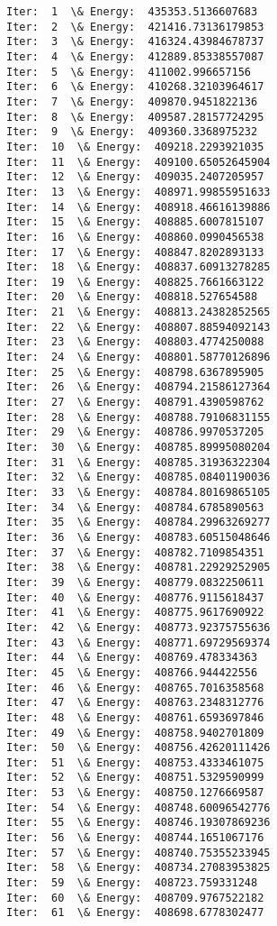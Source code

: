\documentclass[11pt]{article}
\begin{document}
    \begin{Verbatim}[commandchars=\\\{\}]
Iter:  1  \& Energy:  435353.5136607683
Iter:  2  \& Energy:  421416.73136179853
Iter:  3  \& Energy:  416324.43984678737
Iter:  4  \& Energy:  412889.85338557087
Iter:  5  \& Energy:  411002.996657156
Iter:  6  \& Energy:  410268.32103964617
Iter:  7  \& Energy:  409870.9451822136
Iter:  8  \& Energy:  409587.28157724295
Iter:  9  \& Energy:  409360.3368975232
Iter:  10  \& Energy:  409218.2293921035
Iter:  11  \& Energy:  409100.65052645904
Iter:  12  \& Energy:  409035.2407205957
Iter:  13  \& Energy:  408971.99855951633
Iter:  14  \& Energy:  408918.46616139886
Iter:  15  \& Energy:  408885.6007815107
Iter:  16  \& Energy:  408860.0990456538
Iter:  17  \& Energy:  408847.8202893133
Iter:  18  \& Energy:  408837.60913278285
Iter:  19  \& Energy:  408825.7661663122
Iter:  20  \& Energy:  408818.527654588
Iter:  21  \& Energy:  408813.24382852565
Iter:  22  \& Energy:  408807.88594092143
Iter:  23  \& Energy:  408803.4774250088
Iter:  24  \& Energy:  408801.58770126896
Iter:  25  \& Energy:  408798.6367895905
Iter:  26  \& Energy:  408794.21586127364
Iter:  27  \& Energy:  408791.4390598762
Iter:  28  \& Energy:  408788.79106831155
Iter:  29  \& Energy:  408786.9970537205
Iter:  30  \& Energy:  408785.89995080204
Iter:  31  \& Energy:  408785.31936322304
Iter:  32  \& Energy:  408785.08401190036
Iter:  33  \& Energy:  408784.80169865105
Iter:  34  \& Energy:  408784.6785890563
Iter:  35  \& Energy:  408784.29963269277
Iter:  36  \& Energy:  408783.60515048646
Iter:  37  \& Energy:  408782.7109854351
Iter:  38  \& Energy:  408781.22929252905
Iter:  39  \& Energy:  408779.0832250611
Iter:  40  \& Energy:  408776.9115618437
Iter:  41  \& Energy:  408775.9617690922
Iter:  42  \& Energy:  408773.92375755636
Iter:  43  \& Energy:  408771.69729569374
Iter:  44  \& Energy:  408769.478334363
Iter:  45  \& Energy:  408766.944422556
Iter:  46  \& Energy:  408765.7016358568
Iter:  47  \& Energy:  408763.2348312776
Iter:  48  \& Energy:  408761.6593697846
Iter:  49  \& Energy:  408758.9402701809
Iter:  50  \& Energy:  408756.42620111426
Iter:  51  \& Energy:  408753.4333461075
Iter:  52  \& Energy:  408751.5329590999
Iter:  53  \& Energy:  408750.1276669587
Iter:  54  \& Energy:  408748.60096542776
Iter:  55  \& Energy:  408746.19307869236
Iter:  56  \& Energy:  408744.1651067176
Iter:  57  \& Energy:  408740.75355233945
Iter:  58  \& Energy:  408734.27083953825
Iter:  59  \& Energy:  408723.759331248
Iter:  60  \& Energy:  408709.9767522182
Iter:  61  \& Energy:  408698.6778302477

\end{Verbatim}
\end{document}
